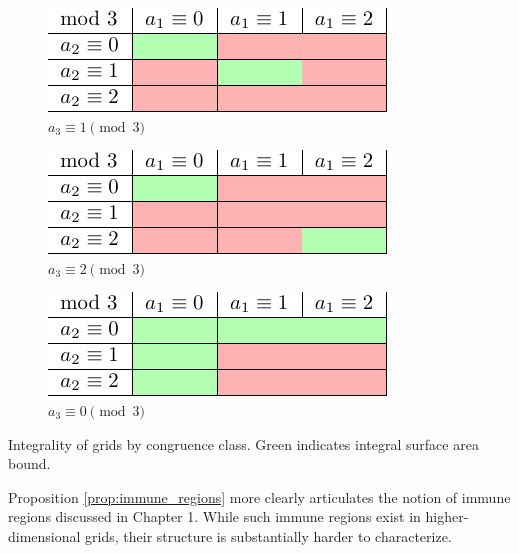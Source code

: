 \begin{table}[]
\centering
\begin{subfigure}{0.3\textwidth}
	\includegraphics[width=\textwidth]{tables/1/integral_bounds_thickness_1.pdf}
	\caption{$a_3 \equiv 1 \pmod 3$}
	\label{tab:integral_bounds_a}
\end{subfigure} \hfill%
\begin{subfigure}{0.3\textwidth}
	\includegraphics[width=\textwidth]{tables/1/integral_bounds_thickness_2.pdf}
	\caption{$a_3 \equiv 2 \pmod 3$}
	\label{tab:integral_bounds_b}
\end{subfigure} \hfill%
\begin{subfigure}{0.3\textwidth}
	\includegraphics[width=\textwidth]{tables/1/integral_bounds_thickness_3.pdf}
	\caption{$a_3 \equiv 0 \pmod 3$}
	\label{tab:integral_bounds_c}
\end{subfigure}
\caption{Integrality of grids by congruence class. Green indicates integral surface area bound.}
\label{tab:integral_bounds}
\end{table} 

Proposition \ref{prop:immune_regions} more clearly articulates the notion of immune regions discussed in Chapter 1. While such immune regions exist in higher-dimensional grids, their structure is substantially harder to characterize. 

